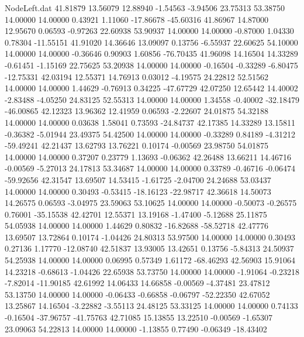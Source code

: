 \begin{filecontents}{NodeLeft.dat}
  41.81879   13.56079   12.88940    -1.54563   -3.94506   23.75313   53.38750   14.00000   14.00000    0.43921    1.11060  -17.86678  -45.60316
  41.86967   14.87000   12.95670     0.06593   -0.97263   22.60938   53.90937   14.00000   14.00000   -0.87000    1.04330    0.78304  -11.55151
  41.91020   14.36646   13.09097     0.13756   -6.55937   22.60625   54.10000   14.00000   14.00000   -0.36646    0.90903    1.60856  -76.70435
  41.96098   14.16504   14.33289    -0.61451   -1.15169   22.75625   53.20938   14.00000   14.00000   -0.16504   -0.33289   -6.80475  -12.75331
  42.03194   12.55371   14.76913     0.03012   -4.19575   24.22812   52.51562   14.00000   14.00000    1.44629   -0.76913    0.34225  -47.67729
  42.07250   12.65442   14.40002    -2.83488   -4.05250   24.83125   52.55313   14.00000   14.00000    1.34558   -0.40002  -32.18479  -46.00865
  42.12323   13.96362   12.41959     0.06593   -2.22607   24.01875   54.32188   14.00000   14.00000    0.03638    1.58041    0.73593  -24.84737
  42.17385   14.33289   13.15811    -0.36382   -5.01944   23.49375   54.42500   14.00000   14.00000   -0.33289    0.84189   -4.31212  -59.49241
  42.21437   13.62793   13.76221     0.10174   -0.00569   23.98750   54.01875   14.00000   14.00000    0.37207    0.23779    1.13693   -0.06362
  42.26488   13.66211   14.46716    -0.00569   -5.27013   24.17813   53.34687   14.00000   14.00000    0.33789   -0.46716   -0.06474  -59.92656
  42.31547   13.69507   14.53415    -1.61725   -2.04700   24.24688   53.03437   14.00000   14.00000    0.30493   -0.53415  -18.16123  -22.98717
  42.36618   14.50073   14.26575     0.06593   -3.04975   23.59063   53.10625   14.00000   14.00000   -0.50073   -0.26575    0.76001  -35.15538
  42.42701   12.55371   13.19168    -1.47400   -5.12688   25.11875   54.05938   14.00000   14.00000    1.44629    0.80832  -16.82688  -58.52718
  42.47776   13.69507   13.72864     0.10174   -1.04426   24.80313   53.97500   14.00000   14.00000    0.30493    0.27136    1.17770  -12.08740
  42.51837   13.93005   13.42651     0.13756   -5.84313   24.50937   54.25938   14.00000   14.00000    0.06995    0.57349    1.61172  -68.46293
  42.56903   15.91064   14.23218    -0.68613   -1.04426   22.65938   53.73750   14.00000   14.00000   -1.91064   -0.23218   -7.82014  -11.90185
  42.61992   14.06433   14.66858    -0.00569   -4.37481   23.47812   53.13750   14.00000   14.00000   -0.06433   -0.66858   -0.06797  -52.22350
  42.67052   13.25867   14.16504    -3.22882   -3.55113   24.48125   53.33125   14.00000   14.00000    0.74133   -0.16504  -37.96757  -41.75763
  42.71085   15.13855   13.22510    -0.00569   -1.65307   23.09063   54.22813   14.00000   14.00000   -1.13855    0.77490   -0.06349  -18.43402

\end{filecontents}
